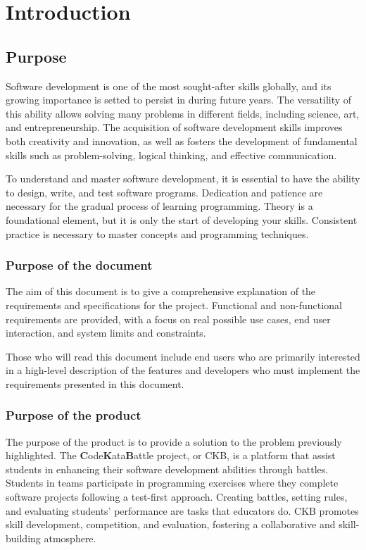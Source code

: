\chapter{Introduction}

\section{Purpose}
Software development is one of the most sought-after skills globally, and its growing importance is setted to persist in during future years.
The versatility of this ability allows solving many problems in different fields, including science, art, and entrepreneurship.
The acquisition of software development skills improves both creativity and innovation, as well as fosters the development of fundamental skills such as problem-solving, logical thinking, and effective communication.

To understand and master software development, it is essential to have the ability to design, write, and test software programs.
Dedication and patience are necessary for the gradual process of learning programming.
Theory is a foundational element, but it is only the start of developing your skills. Consistent practice is necessary to master concepts and programming techniques.

\subsection{Purpose of the document}
The aim of this document is to give a comprehensive explanation of the requirements and specifications for the project.
Functional and non-functional requirements are provided, with a focus on real possible use cases, end user interaction, and system limits and constraints.

Those who will read this document include end users who are primarily interested in a high-level description of the features
and developers who must implement the requirements presented in this document.

\subsection{Purpose of the product}
The purpose of the product is to provide a solution to the problem previously highlighted.
The \textbf{C}ode\textbf{K}ata\textbf{B}attle project, or CKB, is a platform that assist students in enhancing their software development abilities through battles.
Students in teams participate in programming exercises where they complete software projects following a test-first approach.
Creating battles, setting rules, and evaluating students' performance are tasks that educators do.
CKB promotes skill development, competition, and evaluation, fostering a collaborative and skill-building atmosphere.

